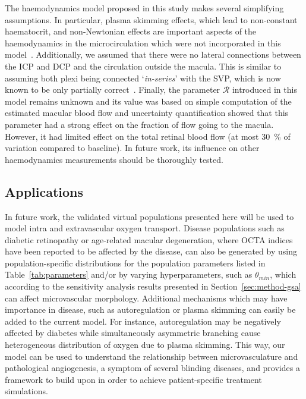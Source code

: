 \documentclass[11pt,]{article}
\begin{document}
The haemodynamics model proposed in this study makes several simplifying assumptions.
In particular, plasma skimming effects, which lead to non-constant haematocrit, and non-Newtonian effects are important aspects of the haemodynamics in the microcirculation which were not incorporated in this model~\cite{Faahraeus1931,Secomb2013}.
Additionally, we assumed that there were no lateral connections between the ICP and DCP and the circulation outside the macula.
This is similar to assuming both plexi being connected `\textit{in-series}' with the SVP, which is now known to be only partially correct~\cite{An2020}.
Finally, the parameter $\mathcal R$ introduced in this model remains unknown and its value was based on simple computation of the estimated macular blood flow and uncertainty quantification showed that this parameter had a strong effect on the fraction of flow going to the macula.
However, it had limited effect on the total retinal blood flow (at most \SI{30}{\percent} of variation compared to baseline).
In future work, its influence on other haemodynamics measurements should be thoroughly tested.

\subsection{Applications}

In future work, the validated virtual populations presented here will be used to model intra and extravascular oxygen transport.
Disease populations such as diabetic retinopathy or age-related macular degeneration, where OCTA indices have been reported to be affected by the disease, can also be generated by using population-specific distributions for the population parameters listed in Table~\ref{tab:parameters} and/or by varying hyperparameters, such as $\theta_{min}$, which according to the sensitivity analysis results presented in Section~\ref{sec:method-gsa} can affect microvascular morphology.
Additional mechanisms which may have importance in disease, such as autoregulation\cite{Guidoboni2014,Arciero2013} or plasma skimming\cite{Ganesan_2010} can easily be added to the current model.
For instance, autoregulation may be negatively affected by diabetes\cite{Stitt_2016} while simultaneously asymmetric branching cause heterogeneous distribution of oxygen due to plasma skimming.
This way, our model can be used to understand the relationship between microvasculature and pathological angiogenesis, a symptom of several blinding diseases\cite{Medina_2016}, and provides a framework to build upon in order to achieve patient-specific treatment simulations.
\end{document}
